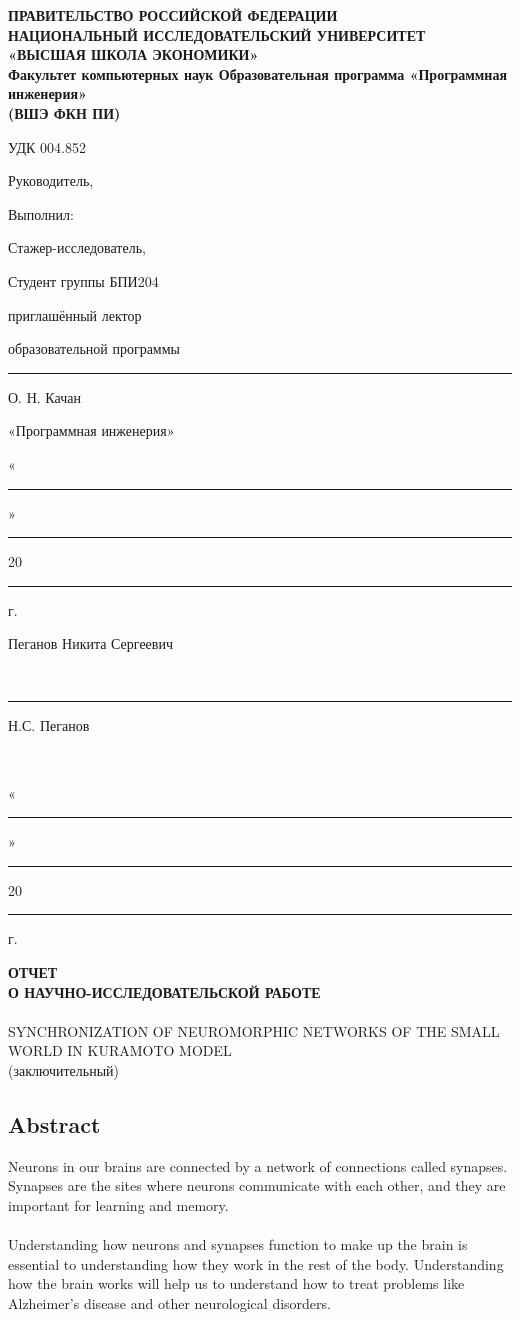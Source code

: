 \documentclass[draft]{article}
\newcommand\zz[1]{\par{\normalsize\strut #1} \hfill\ignorespaces}
\newcommand\tab[1][1cm]{\hspace*{#1}}
\begin{document}
 
\begin{center}
\textbf{
ПРАВИТЕЛЬСТВО РОССИЙСКОЙ ФЕДЕРАЦИИ\\
НАЦИОНАЛЬНЫЙ ИССЛЕДОВАТЕЛЬСКИЙ УНИВЕРСИТЕТ\\
«ВЫСШАЯ ШКОЛА ЭКОНОМИКИ»\\
Факультет компьютерных наук
Образовательная программа «Программная инженерия»\\
(ВШЭ ФКН ПИ)}\\
\end{center}
УДК 004.852
\bigskip
\zz{Руководитель,}Выполнил:
\zz{Стажер-исследователь,}Студент группы БПИ204
\zz{приглашённый лектор}образовательной программы
\zz{\noindent\rule{3cm}{0.4pt} О. Н. Качан}«Программная инженерия»
\zz{«\noindent\rule{1cm}{0.4pt}»\noindent\rule{2cm}{0.4pt}20\noindent\rule{0.5cm}{0.4pt}г.}Пеганов Никита Сергеевич
\zz{~}\noindent\rule{3cm}{0.4pt}Н.С. Пеганов
\zz{~}«\noindent\rule{1cm}{0.4pt}»\noindent\rule{2cm}{0.4pt}20\noindent\rule{0.5cm}{0.4pt}г.
\begin{center}
\topskip=0pt
\vspace*{\fill}
\textbf{ОТЧЕТ\\
О НАУЧНО-ИССЛЕДОВАТЕЛЬСКОЙ РАБОТЕ}\\
~\\
SYNCHRONIZATION OF NEUROMORPHIC NETWORKS OF THE SMALL WORLD IN KURAMOTO MODEL\\
(заключительный)\\
\vspace*{\fill}
\end{center}
\begin{center}
\vspace*{\fill}{
  Москва 2022}
\end{center}
\newpage
\begin{center}
\section {Abstract}
\end{center}
\tab Neurons in our brains are connected by a network of connections called synapses. Synapses are the sites where neurons communicate with each other, and they are important for learning and memory.\\
~\\
\tab Understanding how neurons and synapses function to make up the brain is essential to understanding how they work in the rest of the body. Understanding how the brain works will help us to understand how to treat problems like Alzheimer’s disease and other neurological disorders.\\
\end{document}
